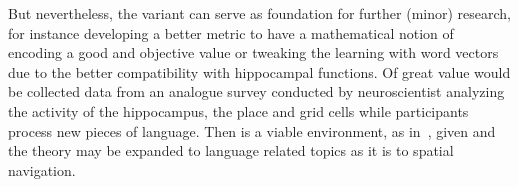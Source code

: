 But nevertheless, the \onehot{} variant can serve as foundation for further (minor) research, for instance developing a better metric to have a mathematical notion of encoding a good and objective value or tweaking the learning with word vectors due to the better compatibility with hippocampal functions. Of great value would be collected data from an analogue survey conducted by neuroscientist \ie analyzing the activity of the hippocampus, the place and grid cells while participants process new pieces of language. Then is a viable environment, as in~\cite{StBoGe17HPM}, given and the theory may be expanded to language related topics as it is to spatial navigation.
